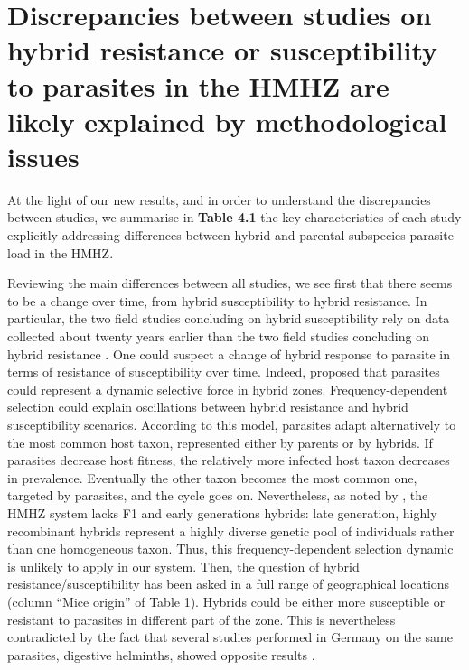 \section{Discrepancies between studies on hybrid resistance or susceptibility to parasites in the HMHZ are likely explained by methodological issues}
At the light of our new results, and in order to understand the discrepancies between studies, we summarise in \textbf{Table 4.1} the key characteristics of each study explicitly addressing differences between hybrid and parental subspecies parasite load in the HMHZ. \par
Reviewing the main differences between all studies, we see first that there seems to be a change over time, from hybrid susceptibility to hybrid resistance. In particular, the two field studies concluding on hybrid susceptibility \citep{sage_wormy_1986, moulia_wormy_1991} rely on data collected about twenty years earlier than the two field studies concluding on hybrid resistance \citep{baird_where_2012, Balard2020}. One could suspect a change of hybrid response to parasite in terms of resistance of susceptibility over time. Indeed, \cite{wolinska_parasites_2008} proposed that parasites could represent a dynamic selective force in hybrid zones. Frequency-dependent selection could explain oscillations between hybrid resistance and hybrid susceptibility scenarios. According to this model, parasites adapt alternatively to the most common host taxon, represented either by parents or by hybrids. If parasites decrease host fitness, the relatively more infected host taxon decreases in prevalence. Eventually the other taxon becomes the most common one, targeted by parasites, and the cycle goes on. Nevertheless, as noted by \cite{baird_where_2012}, the HMHZ system lacks F1 and early generations hybrids: late generation, highly recombinant hybrids represent a highly diverse genetic pool of individuals rather than one homogeneous taxon. Thus, this frequency-dependent selection dynamic is unlikely to apply in our system. Then, the question of hybrid resistance/susceptibility has been asked in a full range of geographical locations (column “Mice origin” of Table 1). Hybrids could be either more susceptible or resistant to parasites in different part of the zone. This is nevertheless contradicted by the fact that several studies performed in Germany on the same parasites, digestive helminths, showed opposite results \parencites[hybrid susceptibility for][; hybrid resistance for]{sage_wormy_1986}{baird_where_2012, Balard2020}. 

